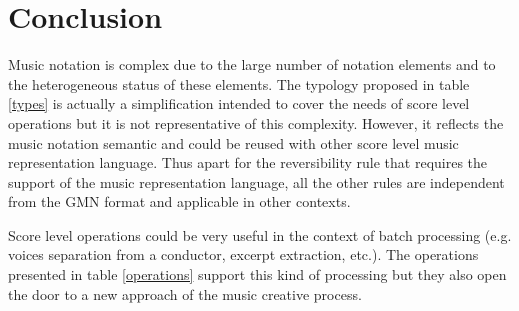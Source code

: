 \documentclass[twoside,10pt,a4paper]{article}
\begin{document}
\section{Conclusion}
Music notation is complex due to the large number of notation elements and to the heterogeneous status of these elements. The typology proposed in table \ref{types} is actually a simplification intended to cover the needs of score level operations but it is not representative of this complexity. However, it reflects the music notation semantic and could be reused with other score level music representation language. Thus apart for the reversibility rule that requires the support of the music representation language, all the other rules are independent from the GMN format and applicable in other contexts.

Score level operations could be very useful in the context of batch processing (e.g. voices separation from a conductor, excerpt extraction, etc.). The operations presented in table \ref{operations} support this kind of processing but they also open the door to a new approach of the music creative process. 



\end{document}
